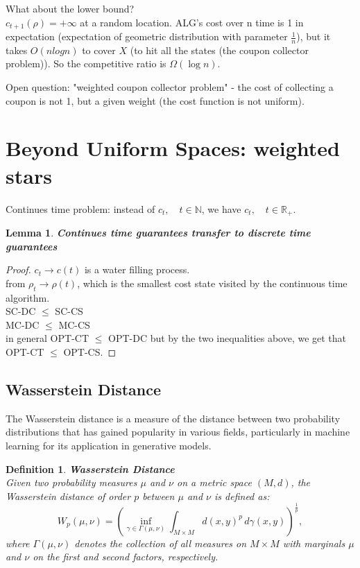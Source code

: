 \documentclass[11pt]{book} %
\newtheorem{lemma}{Lemma}[section]
\newtheorem{definition}{Definition}[section]
\begin{document}
What about the lower bound? \\
$c_{t+1}(\rho) = +\infty$ at a random location.
ALG's cost over n time is 1 in expectation (expectation of geometric distribution with parameter $\frac{1}{n}$), 
but it takes $O(n log n)$ to cover $X$ (to hit all the states (the coupon collector problem)).
So the competitive ratio is $\Omega(\log n)$.

\bigbreak

Open question: "weighted coupon collector problem" - the cost of collecting a coupon is not 1, but a given weight (the cost function is not uniform).


\section{Beyond Uniform Spaces: weighted stars} 

Continues time problem: instead of $c_t, \quad t \in \mathbb{N}$, we have $c_t,\quad t \in \mathbb{R}_+$. 

\begin{lemma}{\textbf{Continues time guarantees transfer to discrete time guarantees}} \end{lemma}

\begin{proof}
    $c_t \to c(t)$ is a water filling process. \\
    from $\rho_t \to \rho(t)$, which is the smallest cost state visited by the continuous time algorithm. \\
    SC-DC $\leq$ SC-CS \\
    MC-DC $\leq$ MC-CS \\
    in general OPT-CT $\leq$ OPT-DC but by the two inequalities above, we get that OPT-CT $\leq$ OPT-CS.
\end{proof}


\subsection{Wasserstein Distance}

The Wasserstein distance is a measure of the distance between two probability distributions that has gained popularity in various fields, 
particularly in machine learning for its application in generative models.

\begin{definition}{\textbf{Wasserstein Distance}} \\
    Given two probability measures \( \mu \) and \( \nu \) on a metric space \( (M, d) \), the Wasserstein distance of order \( p \) between \( \mu \) and \( \nu \) is defined as:
    \[
    W_p(\mu, \nu) = \left( \inf_{\gamma \in \Gamma(\mu, \nu)} \int_{M \times M} d(x,y)^p \, d\gamma(x,y) \right)^{\frac{1}{p}},
    \]
    where \( \Gamma(\mu, \nu) \) denotes the collection of all measures on \( M \times M \) with marginals \( \mu \) and \( \nu \) on the first and second factors, respectively.
\end{definition}
\end{document}
